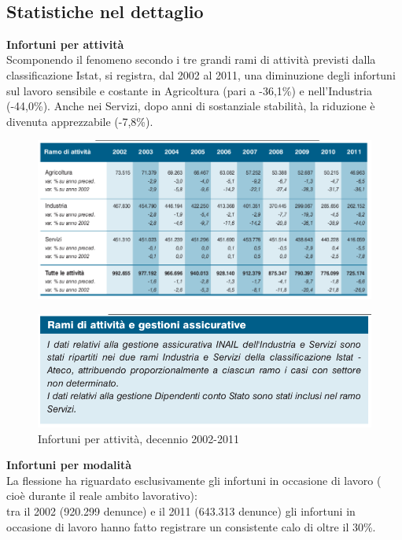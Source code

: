 \ \
\subsection{Statistiche nel dettaglio}

\textbf{Infortuni per attività}\\
Scomponendo il fenomeno secondo i tre grandi rami di attività previsti dalla classificazione Istat, si registra, dal 2002 al 2011, una diminuzione degli infortuni sul lavoro sensibile e costante in Agricoltura (pari a -36,1\%) e nell'Industria (-44,0\%). Anche nei Servizi, dopo anni di sostanziale stabilità, la riduzione è divenuta apprezzabile (-7,8\%).



\begin{figure}[H]
\centering
\includegraphics[scale=0.5]{images/cap4/analisiDiMercato/infortuniDecennioPerGestione1}
\end{figure}

\begin{figure}[H]
\centering
\includegraphics[scale=0.55]{images/cap4/analisiDiMercato/infortuniDecennioPerGestione2}
\caption{Infortuni per attività, decennio 2002-2011}
\end{figure}



\textbf{Infortuni per modalità}\\
La flessione ha riguardato esclusivamente gli infortuni in occasione di lavoro ( cioè durante il reale ambito lavorativo):\\
tra il 2002 (920.299 denunce) e il 2011 (643.313 denunce) gli infortuni in occasione di lavoro hanno fatto registrare un consistente calo di oltre il 30\%.\\

